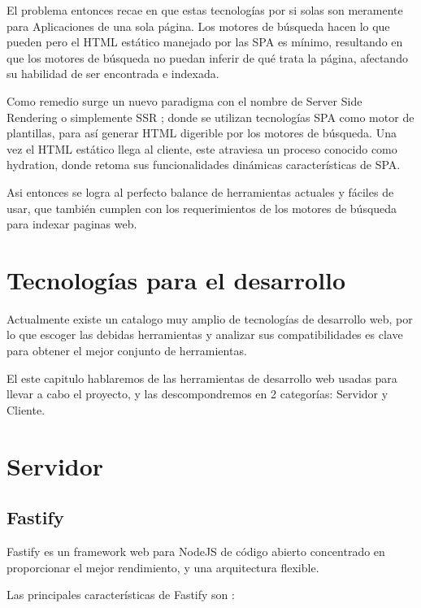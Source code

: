 El problema entonces recae en que estas tecnologías por si solas son meramente para Aplicaciones de una sola página. Los motores de búsqueda hacen lo que pueden pero el HTML estático manejado por las SPA es mínimo, resultando en que los motores de búsqueda no puedan inferir de qué trata la página, afectando su habilidad de ser encontrada e indexada.

Como remedio surge un nuevo paradigma con el nombre de Server Side Rendering o simplemente SSR \cite{ServerSideRendering}; donde se utilizan  tecnologías SPA como motor de plantillas, para así generar HTML digerible por los motores de búsqueda. Una vez el HTML estático llega al cliente, este atraviesa un proceso conocido como hydration, donde retoma sus funcionalidades dinámicas características de SPA.

Asi entonces se logra al perfecto balance de herramientas actuales y fáciles de usar, que también cumplen con los requerimientos de los motores de búsqueda para indexar paginas web.

\section{Tecnologías para el desarrollo}

Actualmente existe un catalogo muy amplio de tecnologías de desarrollo web, por lo que escoger las debidas herramientas y analizar sus compatibilidades es clave para obtener el mejor conjunto de herramientas.

El este capitulo hablaremos de las herramientas de desarrollo web usadas para llevar a cabo el proyecto, y las descompondremos en 2 categorías: Servidor y Cliente.

\section{Servidor}

\subsection{Fastify}

Fastify es un framework web para NodeJS de código abierto concentrado en proporcionar el mejor rendimiento, y una arquitectura flexible. 

Las principales características de Fastify son \cite{FastifyCoreFeatures}:

